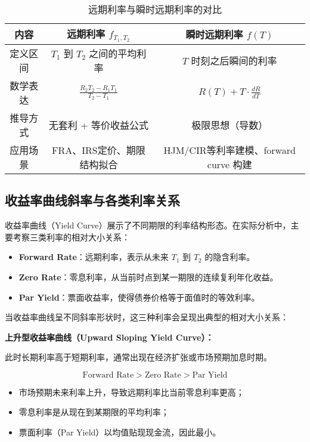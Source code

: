\begin{table}[h]
\centering
\begin{tabular}{|c|c|c|}
\hline
\textbf{内容} & \textbf{远期利率 $f_{T_1,T_2}$} & \textbf{瞬时远期利率 $f(T)$} \\
\hline
定义区间 & $T_1$ 到 $T_2$ 之间的平均利率 & $T$ 时刻之后瞬间的利率 \\
\hline
数学表达 & $\displaystyle \frac{R_2 T_2 - R_1 T_1}{T_2 - T_1}$ & $\displaystyle R(T) + T \cdot \frac{dR}{dT}$ \\
\hline
推导方式 & 无套利 + 等价收益公式 & 极限思想（导数） \\
\hline
应用场景 & FRA、IRS定价、期限结构拟合 & HJM/CIR等利率建模、forward curve 构建 \\
\hline
\end{tabular}
\caption{远期利率与瞬时远期利率的对比}
\end{table}


\subsection{收益率曲线斜率与各类利率关系}

收益率曲线（Yield Curve）展示了不同期限的利率结构形态。在实际分析中，主要考察三类利率的相对大小关系：

\begin{itemize}
    \item \textbf{Forward Rate}：远期利率，表示从未来 $T_1$ 到 $T_2$ 的隐含利率。
    \item \textbf{Zero Rate}：零息利率，从当前时点到某一期限的连续复利年化收益。
    \item \textbf{Par Yield}：票面收益率，使得债券价格等于面值时的等效利率。
\end{itemize}

当收益率曲线呈不同斜率形状时，这三种利率会呈现出典型的相对大小关系：

\textbf{上升型收益率曲线（Upward Sloping Yield Curve）：}

此时长期利率高于短期利率，通常出现在经济扩张或市场预期加息时期。

\begin{equation}
\text{Forward Rate} > \text{Zero Rate} > \text{Par Yield}
\end{equation}

\begin{itemize}
    \item 市场预期未来利率上升，导致远期利率比当前零息利率更高；
    \item 零息利率是从现在到某期限的平均利率；
    \item 票面利率（Par Yield）以均值贴现现金流，因此最小。
\end{itemize}

